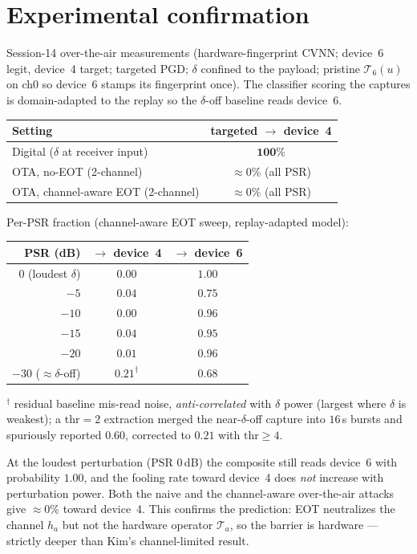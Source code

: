 \documentclass[11pt]{article}
\newcommand{\Top}[1]{\mathcal{T}_{#1}}          %
\begin{document}
\section{Experimental confirmation}\label{sec:results}
Session-14 over-the-air measurements (hardware-fingerprint CVNN; device~6 legit, device~4
target; targeted PGD; $\delta$ confined to the payload; pristine $\Top{6}(u)$ on ch0 so
device~6 stamps its fingerprint once). The classifier scoring the captures is
domain-adapted to the replay so the $\delta$-off baseline reads device~6.

\begin{center}
\begin{tabular}{lc}
\hline
Setting & targeted $\to$ device~4 \\
\hline
Digital ($\delta$ at receiver input) & $\mathbf{100\%}$ \\
OTA, no-EOT (2-channel) & $\approx 0\%$ (all PSR) \\
OTA, channel-aware EOT (2-channel) & $\approx 0\%$ (all PSR) \\
\hline
\end{tabular}
\end{center}

\noindent Per-PSR fraction (channel-aware EOT sweep, replay-adapted model):
\begin{center}
\begin{tabular}{rcc}
\hline
PSR (dB) & $\to$ device~4 & $\to$ device~6 \\
\hline
$0$ (loudest $\delta$) & $0.00$ & $1.00$ \\
$-5$  & $0.04$ & $0.75$ \\
$-10$ & $0.00$ & $0.96$ \\
$-15$ & $0.04$ & $0.95$ \\
$-20$ & $0.01$ & $0.96$ \\
$-30$ ($\approx\delta$-off) & $0.21^{\dagger}$ & $0.68$ \\
\hline
\end{tabular}
\end{center}
{\small $^{\dagger}$ residual baseline mis-read noise, \emph{anti-correlated} with $\delta$
power (largest where $\delta$ is weakest); a $\mathrm{thr}{=}2$ extraction merged the
near-$\delta$-off capture into $16$\,s bursts and spuriously reported $0.60$, corrected to
$0.21$ with $\mathrm{thr}\ge 4$.}

At the loudest perturbation (PSR $0$\,dB) the composite still reads device~6 with
probability $1.00$, and the fooling rate toward device~4 does \emph{not} increase with
perturbation power. Both the naive and the channel-aware over-the-air attacks give
$\approx 0\%$ toward device~4. This confirms the prediction: EOT neutralizes
the channel $h_a$ but not the hardware operator $\Top{a}$, so the barrier is hardware ---
strictly deeper than Kim's channel-limited result.
\end{document}
